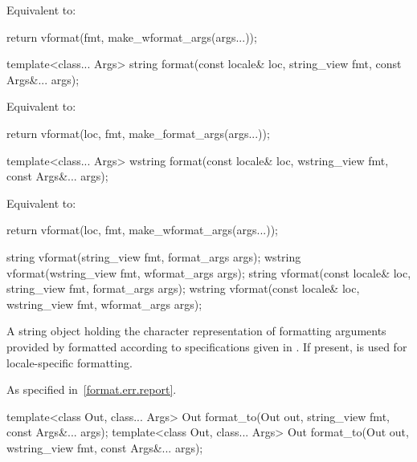\begin{itemdescr}
\pnum
\effects
Equivalent to:
\begin{codeblock}
return vformat(fmt, make_wformat_args(args...));
\end{codeblock}
\end{itemdescr}

%
\begin{itemdecl}
template<class... Args>
  string format(const locale& loc, string_view fmt, const Args&... args);
\end{itemdecl}

\begin{itemdescr}
\pnum
\effects
Equivalent to:
\begin{codeblock}
return vformat(loc, fmt, make_format_args(args...));
\end{codeblock}
\end{itemdescr}

%
\begin{itemdecl}
template<class... Args>
  wstring format(const locale& loc, wstring_view fmt, const Args&... args);
\end{itemdecl}

\begin{itemdescr}
\pnum
\effects
Equivalent to:
\begin{codeblock}
return vformat(loc, fmt, make_wformat_args(args...));
\end{codeblock}
\end{itemdescr}

%
\begin{itemdecl}
string vformat(string_view fmt, format_args args);
wstring vformat(wstring_view fmt, wformat_args args);
string vformat(const locale& loc, string_view fmt, format_args args);
wstring vformat(const locale& loc, wstring_view fmt, wformat_args args);
\end{itemdecl}

\begin{itemdescr}
\pnum
\returns
A string object holding the character representation of
formatting arguments provided by  formatted according to
specifications given in .
If present,  is used for locale-specific formatting.

\pnum
\throws
As specified in~\ref{format.err.report}.
\end{itemdescr}

%
\begin{itemdecl}
template<class Out, class... Args>
  Out format_to(Out out, string_view fmt, const Args&... args);
template<class Out, class... Args>
  Out format_to(Out out, wstring_view fmt, const Args&... args);
\end{itemdecl}

